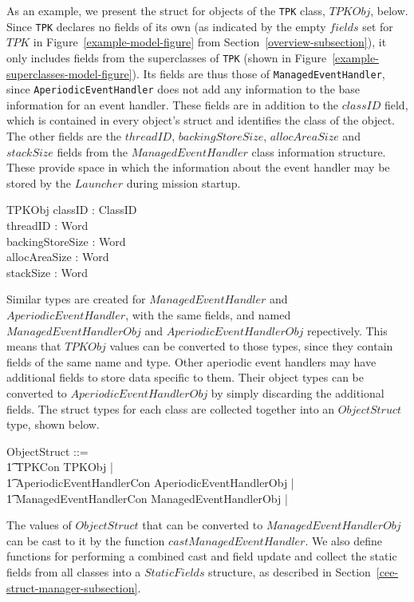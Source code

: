 As an example, we present the struct for objects of the \texttt{TPK}
class, $TPKObj$, below.
Since \texttt{TPK} declares no fields of its own (as indicated by the
empty $fields$ set for $TPK$ in Figure~\ref{example-model-figure} from
Section~\ref{overview-subsection}), it only includes fields from the
superclasses of \texttt{TPK} (shown in
Figure~\ref{example-superclasses-model-figure}).
Its fields are thus those of \texttt{ManagedEventHandler}, since
\texttt{AperiodicEventHandler} does not add any information to the
base information for an event handler.
These fields are in addition to the $classID$ field, which is
contained in every object's struct and identifies the class of the
object.
The other fields are the $threadID$, $backingStoreSize$,
$allocAreaSize$ and $stackSize$ fields from the $ManagedEventHandler$
class information structure.
These provide space in which the information about the event handler
may be stored by the $Launcher$ during mission startup.
\begin{schema}{TPKObj}
  classID : ClassID \\
  threadID : Word \\
  backingStoreSize : Word \\
  allocAreaSize : Word \\
  stackSize : Word
\end{schema}

Similar types are created for $ManagedEventHandler$ and
$AperiodicEventHandler$, with the same fields, and named
$ManagedEventHandlerObj$ and $AperiodicEventHandlerObj$ repectively.
This means that $TPKObj$ values can be converted to those types, since
they contain fields of the same name and type.
Other aperiodic event handlers may have additional fields to store
data specific to them.
Their object types can be converted to $AperiodicEventHandlerObj$ by
simply discarding the additional fields.
The struct types for each class are collected together into an
$ObjectStruct$ type, shown below.
\begin{zed}
  ObjectStruct ::= \\
  \t1 TPKCon \ldata TPKObj \rdata | \\
  \t1 AperiodicEventHandlerCon \ldata AperiodicEventHandlerObj \rdata | \\
  \t1 ManagedEventHandlerCon \ldata ManagedEventHandlerObj \rdata | \cdots {} 
\end{zed}

The values of $ObjectStruct$ that can be converted to
$ManagedEventHandlerObj$ can be cast to it by the function
$castManagedEventHandler$.
We also define functions for performing a combined cast and field
update and collect the static fields from all classes into a
$StaticFields$ structure, as described in
Section~\ref{cee-struct-manager-subsection}.

